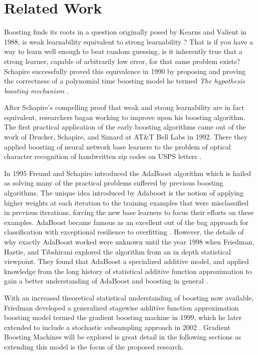 \documentclass[runningheads]{llncs}
\begin{document}
\section{Related Work}

Boosting finds its roots in a question originally posed by Kearns and Valient in 1988, is weak learnability equivalent to strong learnability\cite{Kearns:1988} \cite{KearnsValient:1989}? That is if you have a way to learn well enough to beat random guessing, is it inherently true that a strong learner, capable of arbitrarily low error, for that same problem exists? Schapire successfully proved this equivalence in 1990 by proposing and proving the correctness of a polynomial time boosting model he termed \textit{The hypothesis boosting mechanism} \cite{StrengthOfWeak}. 

After Schapire's compelling proof that weak and strong learnability are in fact equivalent, researchers bagan working to improve upon his boosting algorithm. The first practical application of the early boosting algorithms came out of the work of Drucker, Schapire, and Simard at AT\&T Bell Labs in 1992. There they applied boosting of neural network base learners to the problem of optical character recognition of handwritten zip codes on USPS letters \cite{OCRDruckerHarrisSchapire}. 

In 1995 Freund and Schapire introduced the AdaBoost algorithm which is hailed as solving many of the practical problems suffered by previous boosting algorithms. The unique idea introduced by Adaboost is the notion of applying higher weights at each iteration to the training examples that were misclassified in previous iterations, forcing the new base learners to focus their efforts on these examples. AdaBoost became famous as an excellent out of the bag approach for classification with exceptional resilience to overfitting \cite{adaboost}.  However, the details of why exactly AdaBoost worked were unknown until the year 1998 when Friedman, Hastie, and Tibshirani explored the algorithm from an in depth statistical viewpoint. They found that AdaBoost a specialized additive model, and applied knowledge from the long history of statistical additive function approximation to gain a better understanding of AdaBoost and boosting in general \cite{friedman2000}. 

With an increased theoretical statistical understanding of boosting now available, Friedman developed a generalized stagewise additive function approximation boosting model termed the gradient boosting machine in 1999, which he later extended to include a stochastic subsampling approach in 2002 \cite{2001Friedman} \cite{2002Friedman}. Gradient Boosting Machines will be explored is great detail in the following sections as extending this model is the focus of the proposed research.
\end{document}
